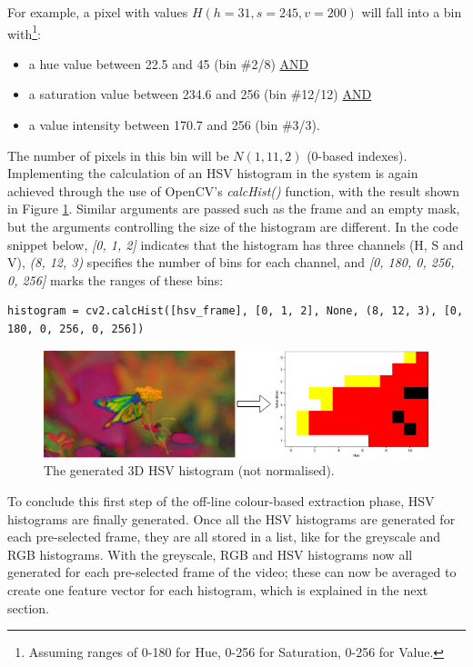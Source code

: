 For example, a pixel with values $H(h=31, s=245, v=200)$ will fall into a bin with\footnote{Assuming ranges of 0-180 for Hue, 0-256 for Saturation, 0-256 for Value.}:
\begin{itemize}
    \item a hue value between 22.5 and 45 (bin \#2/8) \underline{AND}
    \item a saturation value between 234.6 and 256 (bin \#12/12) \underline{AND} 
    \item a value intensity between 170.7 and 256 (bin \#3/3).
\end{itemize}
The number of pixels in this bin will be $N(1,11,2)$ (0-based indexes).\\

Implementing the calculation of an HSV histogram in the system is again achieved through the use of OpenCV's \textit{calcHist()} function, with the result shown in Figure \ref{fig:implementation-hsv_not_normalised}. Similar arguments are passed such as the frame and an empty mask, but the arguments controlling the size of the histogram are different. In the code snippet below, \textit{[0, 1, 2]} indicates that the histogram has three channels (H, S and V), \textit{(8, 12, 3)} specifies the number of bins for each channel, and \textit{[0, 180, 0, 256, 0, 256]} marks the ranges of these bins:

\begin{lstlisting}[numbers=none]
histogram = cv2.calcHist([hsv_frame], [0, 1, 2], None, (8, 12, 3), [0, 180, 0, 256, 0, 256])
\end{lstlisting}

\begin{figure}[h] 
\centerline{\includegraphics[width=\textwidth]{figures/implementation/hsv_not_normalised.png}}
\caption{\label{fig:implementation-hsv_not_normalised}The generated 3D HSV histogram (not normalised).}
\end{figure}

To conclude this first step of the off-line colour-based extraction phase, HSV histograms are finally generated. Once all the HSV histograms are generated for each pre-selected frame, they are all stored in a list, like for the greyscale and RGB histograms. With the greyscale, RGB and HSV histograms now all generated for each pre-selected frame of the video; these can now be averaged to create one feature vector for each histogram, which is explained in the next section.

